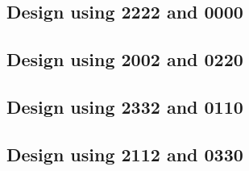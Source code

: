 \subsection{Design using 2222 and 0000}


 \begin{center}




 \end{center}



\subsection{Design using 2002 and 0220}


 \begin{center}




 \end{center}



\subsection{Design using 2332 and 0110}


 \begin{center}




 \end{center}



\subsection{Design using 2112 and 0330}

